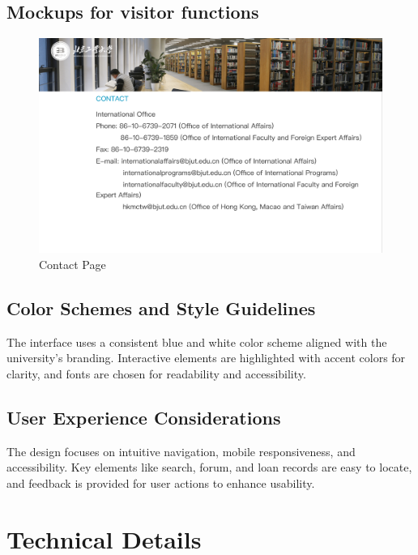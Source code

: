 \documentclass[12pt]{article}
\begin{document}
\subsection{Mockups for visitor functions}

\begin{figure}[H]
    \centering
    \includegraphics[width=\textwidth]{mockups/visitor/contact.png}
    \caption{Contact Page}
    \label{fig:visitor_contact_page}
\end{figure}

\subsection{Color Schemes and Style Guidelines}
The interface uses a consistent blue and white color scheme aligned with the university’s branding. Interactive elements are highlighted with accent colors for clarity, and fonts are chosen for readability and accessibility.

\subsection{User Experience Considerations}
The design focuses on intuitive navigation, mobile responsiveness, and accessibility. Key elements like search, forum, and loan records are easy to locate, and feedback is provided for user actions to enhance usability.

\newpage

\section{Technical Details}
\end{document}
